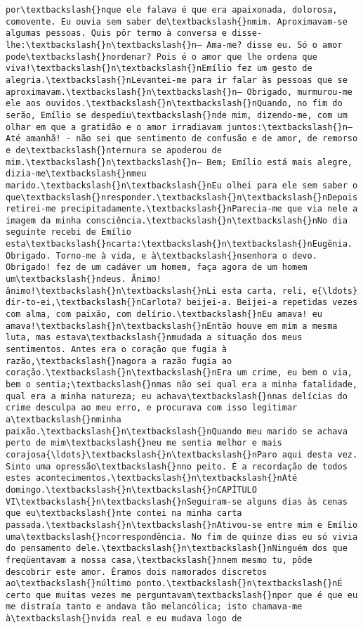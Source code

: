 \begin{Verbatim}[commandchars=\\\{\}]
por\textbackslash{}nque ele falava é que era apaixonada, dolorosa, comovente. Eu ouvia sem saber de\textbackslash{}nmim. Aproximavam-se algumas pessoas. Quis pôr termo à conversa e disse-lhe:\textbackslash{}n\textbackslash{}n— Ama-me? disse eu. Só o amor pode\textbackslash{}nordenar? Pois é o amor que lhe ordena que viva!\textbackslash{}n\textbackslash{}nEmílio fez um gesto de alegria.\textbackslash{}nLevantei-me para ir falar às pessoas que se aproximavam.\textbackslash{}n\textbackslash{}n— Obrigado, murmurou-me ele aos ouvidos.\textbackslash{}n\textbackslash{}nQuando, no fim do serão, Emílio se despediu\textbackslash{}nde mim, dizendo-me, com um olhar em que a gratidão e o amor irradiavam juntos:\textbackslash{}n— Até amanhã! - não sei que sentimento de confusão e de amor, de remorso e de\textbackslash{}nternura se apoderou de mim.\textbackslash{}n\textbackslash{}n— Bem; Emílio está mais alegre, dizia-me\textbackslash{}nmeu marido.\textbackslash{}n\textbackslash{}nEu olhei para ele sem saber o que\textbackslash{}nresponder.\textbackslash{}n\textbackslash{}nDepois retirei-me precipitadamente.\textbackslash{}nParecia-me que via nele a imagem da minha consciência.\textbackslash{}n\textbackslash{}nNo dia seguinte recebi de Emílio esta\textbackslash{}ncarta:\textbackslash{}n\textbackslash{}nEugênia. Obrigado. Torno-me à vida, e à\textbackslash{}nsenhora o devo. Obrigado! fez de um cadáver um homem, faça agora de um homem um\textbackslash{}ndeus. Ânimo! ânimo!\textbackslash{}n\textbackslash{}nLi esta carta, reli, e{\ldots} dir-to-ei,\textbackslash{}nCarlota? beijei-a. Beijei-a repetidas vezes com alma, com paixão, com delírio.\textbackslash{}nEu amava! eu amava!\textbackslash{}n\textbackslash{}nEntão houve em mim a mesma luta, mas estava\textbackslash{}nmudada a situação dos meus sentimentos. Antes era o coração que fugia à razão,\textbackslash{}nagora a razão fugia ao coração.\textbackslash{}n\textbackslash{}nEra um crime, eu bem o via, bem o sentia;\textbackslash{}nmas não sei qual era a minha fatalidade, qual era a minha natureza; eu achava\textbackslash{}nnas delícias do crime desculpa ao meu erro, e procurava com isso legitimar a\textbackslash{}nminha paixão.\textbackslash{}n\textbackslash{}nQuando meu marido se achava perto de mim\textbackslash{}neu me sentia melhor e mais corajosa{\ldots}\textbackslash{}n\textbackslash{}nParo aqui desta vez. Sinto uma opressão\textbackslash{}nno peito. É a recordação de todos estes acontecimentos.\textbackslash{}n\textbackslash{}nAté domingo.\textbackslash{}n\textbackslash{}nCAPÍTULO VI\textbackslash{}n\textbackslash{}nSeguiram-se alguns dias às cenas que eu\textbackslash{}nte contei na minha carta passada.\textbackslash{}n\textbackslash{}nAtivou-se entre mim e Emílio uma\textbackslash{}ncorrespondência. No fim de quinze dias eu só vivia do pensamento dele.\textbackslash{}n\textbackslash{}nNinguém dos que freqüentavam a nossa casa,\textbackslash{}nnem mesmo tu, pôde descobrir este amor. Éramos dois namorados discretos ao\textbackslash{}núltimo ponto.\textbackslash{}n\textbackslash{}nÉ certo que muitas vezes me perguntavam\textbackslash{}npor que é que eu me distraía tanto e andava tão melancólica; isto chamava-me à\textbackslash{}nvida real e eu mudava logo de 
\end{Verbatim}
